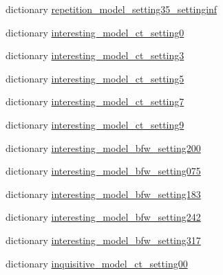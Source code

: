 \begin{DoxyCompactItemize}
\item 
dictionary \hyperlink{namespaceprojects_1_1controllable__dialogue_1_1mturk_1_1model__configs_a430eafa5914b0eae303bfbc9efcb7061}{repetition\+\_\+model\+\_\+setting35\+\_\+settinginf}
\item 
dictionary \hyperlink{namespaceprojects_1_1controllable__dialogue_1_1mturk_1_1model__configs_a54410a70ba6475798435f4b03ebf839e}{interesting\+\_\+model\+\_\+ct\+\_\+setting0}
\item 
dictionary \hyperlink{namespaceprojects_1_1controllable__dialogue_1_1mturk_1_1model__configs_a2b4368e0ad97b53af09cbc975a5ad2fa}{interesting\+\_\+model\+\_\+ct\+\_\+setting3}
\item 
dictionary \hyperlink{namespaceprojects_1_1controllable__dialogue_1_1mturk_1_1model__configs_ab90029b622f13f4a57b2d769da6ea121}{interesting\+\_\+model\+\_\+ct\+\_\+setting5}
\item 
dictionary \hyperlink{namespaceprojects_1_1controllable__dialogue_1_1mturk_1_1model__configs_a5467dd2c739ebf72bcd59bb118ff1bbb}{interesting\+\_\+model\+\_\+ct\+\_\+setting7}
\item 
dictionary \hyperlink{namespaceprojects_1_1controllable__dialogue_1_1mturk_1_1model__configs_a69d5ee108f695a33153339c95e775406}{interesting\+\_\+model\+\_\+ct\+\_\+setting9}
\item 
dictionary \hyperlink{namespaceprojects_1_1controllable__dialogue_1_1mturk_1_1model__configs_a909fcaedc06dcb5fa4a2801ea722f361}{interesting\+\_\+model\+\_\+bfw\+\_\+setting200}
\item 
dictionary \hyperlink{namespaceprojects_1_1controllable__dialogue_1_1mturk_1_1model__configs_ab692c0bdfa6d010b3554db866293bc31}{interesting\+\_\+model\+\_\+bfw\+\_\+setting075}
\item 
dictionary \hyperlink{namespaceprojects_1_1controllable__dialogue_1_1mturk_1_1model__configs_afe8e2cf17d633cff34ce6cee43516959}{interesting\+\_\+model\+\_\+bfw\+\_\+setting183}
\item 
dictionary \hyperlink{namespaceprojects_1_1controllable__dialogue_1_1mturk_1_1model__configs_a5911436c96d5b2ec441156773956696a}{interesting\+\_\+model\+\_\+bfw\+\_\+setting242}
\item 
dictionary \hyperlink{namespaceprojects_1_1controllable__dialogue_1_1mturk_1_1model__configs_ac1667131f1a43ad83f0944efccc39e7b}{interesting\+\_\+model\+\_\+bfw\+\_\+setting317}
\item 
dictionary \hyperlink{namespaceprojects_1_1controllable__dialogue_1_1mturk_1_1model__configs_a65e835d21969070c80c4835df602d05d}{inquisitive\+\_\+model\+\_\+ct\+\_\+setting00}

\end{DoxyCompactItemize}
